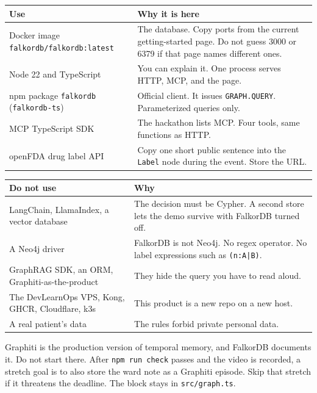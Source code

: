 \documentclass[11pt,a4paper]{article}
\newcommand{\code}[1]{\texttt{#1}}
\newcommand{\file}[1]{\texttt{#1}}
\begin{document}
\begin{center}
\begin{tabularx}{\textwidth}{@{}lX@{}}
\toprule
\textbf{Use} & \textbf{Why it is here} \\
\midrule
Docker image \code{falkordb/falkordb:latest} &
The database. Copy ports from the current getting-started page. Do not guess 3000 or 6379 if that page names different ones. \\
Node 22 and TypeScript &
You can explain it. One process serves HTTP, MCP, and the page. \\
npm package \code{falkordb} (\code{falkordb-ts}) &
Official client. It issues \code{GRAPH.QUERY}. Parameterized queries only. \\
MCP TypeScript SDK &
The hackathon lists MCP. Four tools, same functions as HTTP. \\
openFDA drug label API &
Copy one short public sentence into the \code{Label} node during the event. Store the URL. \\
\bottomrule
\end{tabularx}
\end{center}

\begin{center}
\begin{tabularx}{\textwidth}{@{}lX@{}}
\toprule
\textbf{Do not use} & \textbf{Why} \\
\midrule
LangChain, LlamaIndex, a vector database &
The decision must be Cypher. A second store lets the demo survive with FalkorDB turned off. \\
A Neo4j driver &
FalkorDB is not Neo4j. No regex operator. No label expressions such as \code{(n:A|B)}. \\
GraphRAG SDK, an ORM, Graphiti-as-the-product &
They hide the query you have to read aloud. \\
The DevLearnOps VPS, Kong, GHCR, Cloudflare, k3s &
This product is a new repo on a new host. \\
A real patient's data &
The rules forbid private personal data. \\
\bottomrule
\end{tabularx}
\end{center}

Graphiti is the production version of temporal memory, and FalkorDB documents it.
Do not start there. After \code{npm run check} passes and the video is recorded, a stretch goal is to also store the ward note as a Graphiti episode.
Skip that stretch if it threatens the deadline. The block stays in \file{src/graph.ts}.
\end{document}
